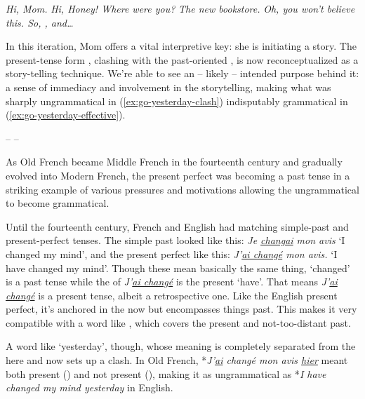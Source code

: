 \ea\label{ex:go-yesterday-effective}
    \begin{dialogue}
         \phantom{..*}\textit{Hi, Mom.}
         \phantom{*}\textit{Hi, Honey! Where were you?}
         \phantom{..*}\textit{The new bookstore.}
         \phantom{*}\textit{Oh, you won't believe this. So, , and\dots}
    \end{dialogue}
\z

In this iteration, Mom offers a vital interpretive key: she is initiating a story. The present-tense form , clashing with the past-oriented , is now reconceptualized as a story-telling technique. We're able to see an -- likely  -- intended purpose behind it: a sense of immediacy and involvement in the storytelling, making what was sharply ungrammatical in (\ref{ex:go-yesterday-clash}) indisputably grammatical in (\ref{ex:go-yesterday-effective}).

\begin{center}
    -- --
\end{center}

As Old French became Middle French in the fourteenth century and gradually evolved into Modern French, the present perfect was becoming a past tense in a striking example of various pressures and motivations allowing the ungrammatical to become grammatical.

Until the fourteenth century, French and English had matching simple-past and present-perfect tenses. The simple past looked like this: \textit{Je \uline{changai} mon avis} `I changed my mind', and the present perfect like this: \textit{J'\uline{ai changé} mon avis.} `I have changed my mind'. Though these mean basically the same thing,  `changed' is a past tense while the  of \textit{J'\uline{ai changé}} is the present `have'. That means \textit{J'\uline{ai changé}} is a present tense, albeit a retrospective one. Like the English present perfect, it's anchored in the now but encompasses things past. This makes it very compatible with a word like , which covers the present and not-too-distant past.

A word like  `yesterday', though, whose meaning is completely separated from the here and now sets up a clash. In Old French, *\textit{J'\uline{ai} changé mon avis \uline{hier}} meant both present () and not present (), making it as ungrammatical as *\textit{I have changed my mind yesterday} in English.

